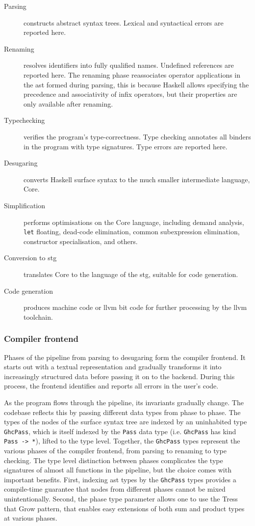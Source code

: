 \documentclass[thesis=B,english]{FITthesis}[2019/12/23]
\newcommand{\hsType}[1]{\texttt{#1}}
\newcommand{\hsCode}[1]{\texttt{#1}}
\begin{document}
\begin{description}
	\item[Parsing] constructs abstract syntax trees. Lexical and syntactical
		errors are reported here.
	\item[Renaming] resolves identifiers into fully qualified names. Undefined
		references are reported here. The renaming phase re\-associates
		operator applications in the \acrshort{ast} formed during parsing, this
		is because Haskell allows specifying the precedence and associativity
		of infix operators, but their properties are only available after
		renaming.
	\item[Typechecking] verifies the program's type-correctness. Type checking
		annotates all binders in the program with type signatures.  Type errors
		are reported here.
	\item[Desugaring] converts Haskell surface syntax to the much smaller
		intermediate language, Core.
	\item[Simplification] performs optimisations on the Core language,
		including demand analysis, \hsCode{let} floating, dead-code
		elimination, common subexpression elimination, constructor
		specialisation, and others.
	\item[Conversion to \acrshort{stg}] translates Core to the language of the
		\acrlong{stg}, suitable for code generation.
	\item[Code generation] produces machine code or \acrshort{llvm} bit code
		for further processing by the \acrshort{llvm} toolchain.
\end{description}

\subsubsection*{Compiler frontend}
Phases of the pipeline from parsing to desugaring form the compiler frontend.
It starts out with a textual representation and gradually transforms it into
increasingly structured data before passing it on to the backend. During this
process, the frontend identifies and reports all errors in the user's code.

As the program flows through the pipeline, its invariants gradually change. The
codebase reflects this by passing different data types from phase to phase. The
types of the nodes of the surface syntax tree are indexed by an uninhabited
type \hsType{GhcPass}, which is itself indexed by the \hsType{Pass} data type
(i.e. \hsType{GhcPass} has kind \hsType{Pass -> *}), lifted to the type level.
Together, the \hsType{GhcPass} types represent the various phases of the
compiler frontend, from parsing to renaming to type checking. The type level
distinction between phases complicates the type signatures of almost all
functions in the pipeline, but the choice comes with important benefits.
First, indexing \acrshort{ast} types by the \hsType{GhcPass} types provides a
compile-time guarantee that nodes from different phases cannot be mixed
unintentionally. Second, the phase type parameter allows one to use the Tress
that Grow pattern\cite{trees-that-grow}, that enables easy extensions of both
sum and product types at various phases.
\end{document}
